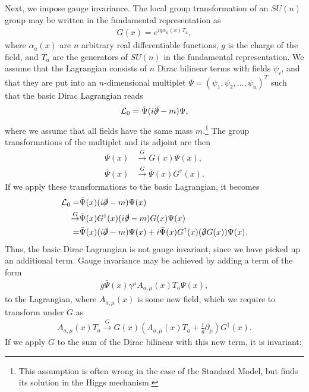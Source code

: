 \documentclass[twoside,english]{uiofysmaster}
\begin{document}
Next, we impose gauge invariance. The local group transformation of an $SU(n)$ group may be written in the fundamental representation as
\begin{align}
	G(x) = e^{ig\alpha_a(x)T_a},\label{eq:gauge_transformation}
\end{align}
where $\alpha_a(x)$ are $n$ arbitrary real differentiable functions, $g$ is the charge of the field, and $T_a$ are the generators of $SU(n)$ in the fundamental representation. We assume that the Lagrangian consists of $n$ Dirac bilinear terms with fields $\psi_i$, and that they are put into an $n$-dimensional multiplet $\Psi = (\psi_1, \psi_2, ..., \psi_n)^T$ such that the basic Dirac Lagrangian reads
\begin{align}
	\mathcal{L}_0 = \bar\Psi(i\slashed\partial - m)\Psi,
\end{align}
where we assume that all fields have the same mass $m$.\footnote{This assumption is often wrong in the case of the Standard Model, but finds its solution in the Higgs mechanism.} The group transformations of the multiplet and its adjoint are then 
\begin{align}
	\Psi(x) &\overset{G}{\to} G(x) \Psi(x),\\
	\bar\Psi(x) &\overset{G}{\to} \bar\Psi(x) G^\dag(x).\nonumber
\end{align}
If we apply these transformations to the basic Lagrangian, it becomes
\begin{align}
	\mathcal{L}_0 = &\bar\Psi(x)(i\slashed\partial - m)\Psi(x)\nonumber\\
	\overset{G}{\to} &\bar\Psi(x) G^\dag(x)(i\slashed\partial - m)G(x)\Psi(x)\\
	=	&\bar\Psi(x)(i\slashed\partial - m)\Psi(x) + i\bar\Psi(x) G^\dag(x) (\slashed \partial G(x)) \Psi(x).\nonumber
\end{align}
Thus, the basic Dirac Lagrangian is not gauge invariant, since we have picked up an additional term. Gauge invariance may be achieved by adding a term of the form 
\begin{align}
	g\bar\Psi(x) \gamma^\mu A_{a,\mu}(x) T_a \Psi(x),\label{eq:covariantderivativeterm}
\end{align}
to the Lagrangian, where $A_{a,\mu}(x)$ is some new field, which we require to transform under $G$ as
\begin{align}
	A_{a,\mu}(x)T_a \overset{G}{\to} G(x) \left( A_{a,\mu}(x) T_a + \frac{1}{g}\partial_\mu \right) G^\dag(x).\label{eq:gauge_boson_transformation}
\end{align}
If we apply $G$ to the sum of the Dirac bilinear with this new term, it is invariant:
\end{document}
